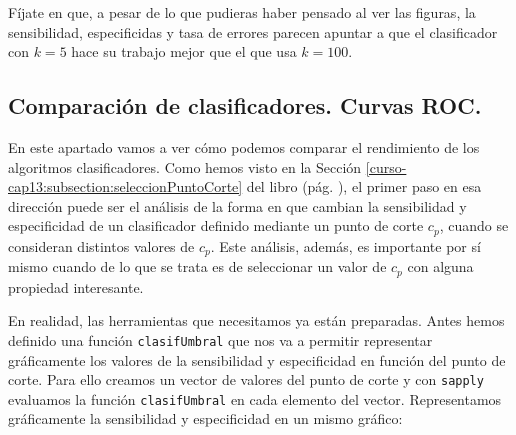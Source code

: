 \documentclass[10pt,a4paper]{article}\usepackage[]{graphicx}\usepackage[]{color}
\begin{document}
Fíjate en que, a pesar de lo que pudieras haber pensado al ver las figuras, la sensibilidad, especificidas y tasa de errores parecen apuntar a que el clasificador con $k=5$ hace su trabajo mejor que el que usa $k=100$.

\subsection{Comparación de clasificadores. Curvas ROC.}
\label{tut13:subsection:ComaracionClasificadoresCurvasROC}

En este apartado vamos a ver cómo podemos comparar el rendimiento de los algoritmos clasificadores. Como hemos visto en la Sección \ref{curso-cap13:subsection:seleccionPuntoCorte} del libro (pág. \pageref{curso-cap13:subsection:seleccionPuntoCorte}), el primer paso en esa dirección puede ser el análisis de la forma en que cambian la sensibilidad y especificidad de un clasificador definido mediante un punto de corte $c_p$, cuando se consideran distintos valores de $c_p$. Este análisis, además, es importante por sí mismo cuando de lo que se trata es de seleccionar un valor de $c_p$ con alguna propiedad interesante.


En realidad, las herramientas que necesitamos ya están preparadas. Antes hemos definido una función {\tt clasifUmbral} que nos va a permitir representar gráficamente los valores de la sensibilidad y especificidad en función del punto de corte. Para ello creamos un vector de valores del punto de corte y con {\tt sapply} evaluamos la función {\tt clasifUmbral} en cada elemento del vector. Representamos gráficamente la sensibilidad y especificidad en un mismo gráfico:
\end{document}
